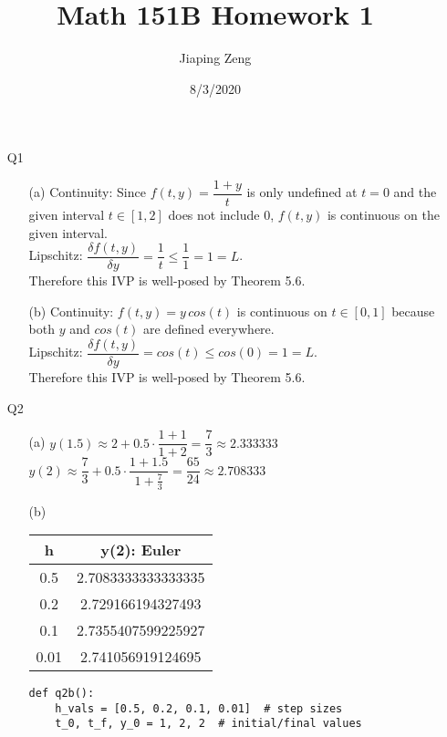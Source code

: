 \documentclass{article}
\title{Math 151B Homework 1}
\date{8/3/2020}
\author{Jiaping Zeng}
\begin{document}
\maketitle

\begin{itemize}
    \item [Q1]
          \begin{itemize}
              \item [(a)] Continuity: Since $f(t,y)=\dfrac{1+y}{t}$ is only undefined at $t=0$ and the given interval $t\in[1,2]$ does not include $0$, $f(t,y)$ is continuous on the given interval.\\Lipschitz: $\dfrac{\delta f(t,y)}{\delta y}=\dfrac{1}{t}\leq\dfrac{1}{1}=1=L$.\\Therefore this IVP is well-posed by Theorem 5.6.
              \item [(b)] Continuity: $f(t,y)=y\,cos(t)$ is continuous on $t\in[0,1]$ because both $y$ and $cos(t)$ are defined everywhere.\\Lipschitz: $\dfrac{\delta f(t,y)}{\delta y}=cos(t)\leq cos(0)=1=L$.\\Therefore this IVP is well-posed by Theorem 5.6.
          \end{itemize}
    \item [Q2]
          \begin{itemize}
              \item [(a)] $y(1.5)\approx 2+0.5\cdot\dfrac{1+1}{1+2}=\dfrac{7}{3}\approx 2.333333$\\$y(2)\approx \dfrac{7}{3}+0.5\cdot\dfrac{1+1.5}{1+\frac{7}{3}}=\boxed{\dfrac{65}{24}}\approx 2.708333$
              \item [(b)]
                    \begin{tabular}{|c|c|}
                        \hline
                        h    & y(2): Euler        \\
                        \hline
                        0.5  & 2.7083333333333335 \\
                        \hline
                        0.2  & 2.729166194327493  \\
                        \hline
                        0.1  & 2.7355407599225927 \\
                        \hline
                        0.01 & 2.741056919124695  \\
                        \hline
                    \end{tabular}
                    \begin{verbatim}
def q2b():
    h_vals = [0.5, 0.2, 0.1, 0.01]  # step sizes
    t_0, t_f, y_0 = 1, 2, 2  # initial/final values


\end{verbatim}
\end{itemize}
\end{itemize}
\end{document}
